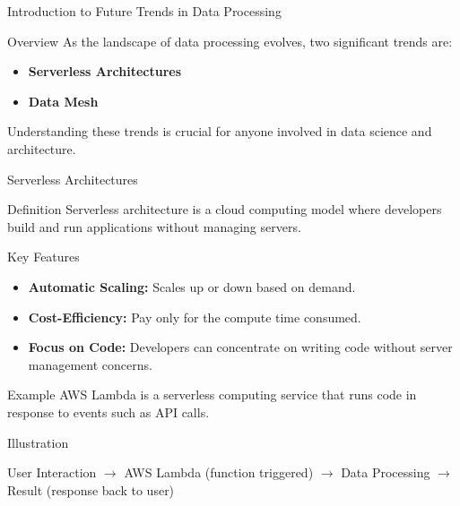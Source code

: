 \documentclass[aspectratio=169]{beamer}
\begin{document}
\begin{frame}[fragile]{Introduction to Future Trends in Data Processing}
    \begin{block}{Overview}
        As the landscape of data processing evolves, two significant trends are:
        \begin{itemize}
            \item \textbf{Serverless Architectures}
            \item \textbf{Data Mesh}
        \end{itemize}
        Understanding these trends is crucial for anyone involved in data science and architecture.
    \end{block}
\end{frame}

\begin{frame}[fragile]{Serverless Architectures}
    \begin{block}{Definition}
        Serverless architecture is a cloud computing model where developers build and run applications without managing servers.
    \end{block}
    
    \begin{block}{Key Features}
        \begin{itemize}
            \item \textbf{Automatic Scaling:} Scales up or down based on demand.
            \item \textbf{Cost-Efficiency:} Pay only for the compute time consumed.
            \item \textbf{Focus on Code:} Developers can concentrate on writing code without server management concerns.
        \end{itemize}
    \end{block}
    
    \begin{block}{Example}
        AWS Lambda is a serverless computing service that runs code in response to events such as API calls.
    \end{block}
    
    \begin{block}{Illustration}
        \begin{center}
        User Interaction $\rightarrow$ AWS Lambda (function triggered) $\rightarrow$ Data Processing $\rightarrow$ Result (response back to user)
        \end{center}
    \end{block}
\end{frame}
\end{document}
